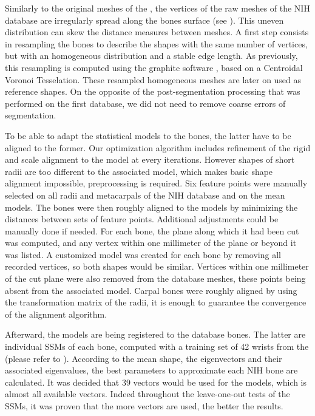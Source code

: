 Similarly to the original meshes of the \db*, the vertices of the raw meshes of the NIH database are irregularly spread along the bones surface (see ). This uneven distribution can skew the distance measures between meshes. A first step consists in resampling the bones to describe the shapes with the same number of vertices, but with an homogeneous distribution and a stable edge length. As previously, this resampling is computed using the graphite software \cite{graphite}, based on a Centroidal Voronoi Tesselation. These resampled homogeneous meshes are later on used as reference shapes. On the opposite of the post-segmentation processing that was performed on the first database, we did not need to remove coarse errors of segmentation.

To be able to adapt the statistical models to the bones, the latter have to be aligned to the former. Our optimization algorithm includes refinement of the rigid and scale alignment to the model at every iterations. However shapes of short radii are too different to the associated model, which makes basic shape alignment impossible, preprocessing is required. Six feature points were manually selected on all radii and metacarpals of the NIH database and on the mean models. The bones were then roughly aligned to the models by minimizing the distances between sets of feature points. Additional adjustments could be manually done if needed. For each bone, the plane along which it had been cut was computed, and any vertex within one millimeter of the plane or beyond it was listed. A customized model was created for each bone by removing all recorded vertices, so both shapes would be similar. Vertices within one millimeter of the cut plane were also removed from the database meshes, these points being absent from the associated model. Carpal bones were roughly aligned by using the transformation matrix of the radii, it is enough to guarantee the convergence of the alignment algorithm. 

Afterward, the models are being registered to the database bones. The latter are individual SSMs of each bone, computed with a training set of 42 wrists from the \db* (please refer to ). According to the mean shape, the eigenvectors and their associated eigenvalues, the best parameters to approximate each NIH bone are calculated. It was decided that 39 vectors would be used for the models, which is almost all available vectors. Indeed throughout the leave-one-out tests of the SSMs, it was proven that the more vectors are used, the better the results. 

